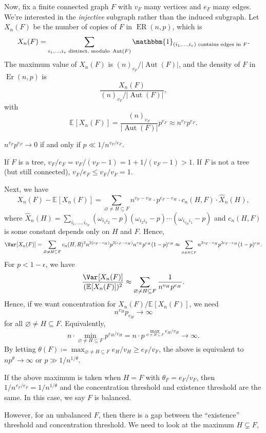 
Now, fix a finite connected graph \(F\) with \(v_F\) many vertices and \(e_F\) many edges. We're interested in the \emph{injective} subgraph rather than the induced subgraph. Let \(X_n(F)\) be the number of copies of \(F\) in \(\operatorname{ER}(n, p) \), which is
\[
	X_n(F)
	= \sum_{i_1, \dots , i_v \text{ distinct, modulo } \operatorname{Aut}(F) } \mathbbm{1}_{(i_1, \dots , i_v)\text{ contains edges in } F}.
\]
The maximum value of \(X_n(F)\) is \((n)_{v_F} / \lvert \operatorname{Aut}(F)  \rvert \), and the density of \(F\) in \(\operatorname{Er}(n, p) \) is
\[
	\frac{X_n(F)}{(n)_{v_F} / \lvert \operatorname{Aut}(F)  \rvert },
\]
with
\[
	\mathbb{E}_{}[X_n(F)]
	= \frac{(n)_{v_F}}{\lvert \operatorname{Aut}(F)  \rvert } p^{e_F}
	\approx n^{v_F} p^{e_F}.
\]
\begin{note}
	\(n^{v_F} p^{e_F} \to 0\) if and only if \(p \ll 1 / n^{v_F / e_F}\).
\end{note}
If \(F\) is a tree, \(v_F / e_F = v_F / (v_F - 1) = 1 + 1 / (v_F - 1) > 1\). If \(F\) is not a tree (but still connected), \(v_F / e_F \leq v_F / v_F = 1\).

Next, we have
\[
	X_n(F) - \mathbb{E}_{}[X_n(F)]
	= \sum_{\varnothing \neq H \subseteq F} n^{v_F - v_H} \cdot p^{e_F - e_H} \cdot c_n(H, F) \cdot \hat{X} _n(H),
\]
where \(\hat{X} _n(H) = \sum_{i_1, \dots , i_{v_H}}  (\omega _{i_1 i_2} - p) (\omega _{i_2 i_3} - p) \cdots (\omega _{i_{v_H} i_1} - p)\) and \(c_n(H, F)\) is some constant depends only on \(H\) and \(F\). Hence,
\[
	\Var_{}[X_n(F)]
	= \sum_{\varnothing \neq H \subseteq F} c_n(H, R)^2 n^{2 (v_F - v_H)} p^{2(e_F - e_H)} n^{v_H} p^{e_H} (1 - p)^{e_H}
	\approx \sum_{_{\varnothing \neq H \subseteq F}} n^{2 v_F - v_H} p^{2 e_F - e_H} (1 - p)^{e_H}.
\]
For \(p < 1 - \epsilon \), we have
\[
	\frac{\Var_{}[X_n(F)] }{(\mathbb{E}_{}[X_n(F)] )^2}
	\approx \sum_{\varnothing \neq H \subseteq F} \frac{1}{n^{v_H} p^{e_H}}.
\]
Hence, if we want concentration for \(X_n(F) / \mathbb{E}_{}[X_n(F)] \), we need
\[
	n^{v_H} p_{e_H} \to \infty
\]
for all \(\varnothing \neq H \subseteq F\). Equivalently,
\[
	n \cdot \min _{\varnothing \neq H \subseteq F} p^{e_H / v_H}
	= n \cdot p^{\max _{\varnothing \neq H \subseteq F} e_H / v_H}
	\to \infty.
\]
By letting \(\theta (F) \coloneqq \max _{\varnothing \neq H \subseteq F} e_H / v_H \geq e_F / v_F\), the above is equivalent to \(n p^\theta \to \infty \) or \(p \gg 1 / n^{1 / \theta }\).

\begin{remark}
	If the above maximum is taken when \(H = F\) with \(\theta _F = e_F / v_F\), then \(1 / n^{v_F / e_F} = 1 / n^{1 / \theta }\) and the concentration threshold and existence threshold are the same. In this case, we say \(F\) is balanced.

	However, for an unbalanced \(F\), then there is a gap between the ``existence'' threshold and concentration threshold. We need to look at the maximum \(H \subsetneq F\),
\end{remark}

